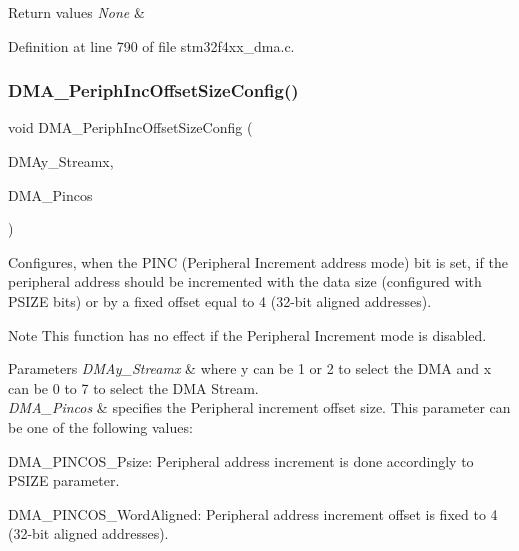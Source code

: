 \begin{DoxyRetVals}{Return values}
{\em None} & \\
\hline
\end{DoxyRetVals}


Definition at line 790 of file stm32f4xx\+\_\+dma.\+c.

\mbox{\label{group___d_m_a_ga210a9861460b3c9b3fa14fdc1a949744}} 
\subsubsection{\texorpdfstring{D\+M\+A\+\_\+\+Periph\+Inc\+Offset\+Size\+Config()}{DMA\_PeriphIncOffsetSizeConfig()}}
{\footnotesize\ttfamily void D\+M\+A\+\_\+\+Periph\+Inc\+Offset\+Size\+Config (\begin{DoxyParamCaption}\item[{\hyperlink{struct_d_m_a___stream___type_def}{D\+M\+A\+\_\+\+Stream\+\_\+\+Type\+Def} $\ast$}]{D\+M\+Ay\+\_\+\+Streamx,  }\item[{uint32\+\_\+t}]{D\+M\+A\+\_\+\+Pincos }\end{DoxyParamCaption})}



Configures, when the P\+I\+NC (Peripheral Increment address mode) bit is set, if the peripheral address should be incremented with the data size (configured with P\+S\+I\+ZE bits) or by a fixed offset equal to 4 (32-\/bit aligned addresses). 

\begin{DoxyNote}{Note}
This function has no effect if the Peripheral Increment mode is disabled.
\end{DoxyNote}

\begin{DoxyParams}{Parameters}
{\em D\+M\+Ay\+\_\+\+Streamx} & where y can be 1 or 2 to select the D\+MA and x can be 0 to 7 to select the D\+MA Stream. \\
\hline
{\em D\+M\+A\+\_\+\+Pincos} & specifies the Peripheral increment offset size. This parameter can be one of the following values\+: \begin{DoxyItemize}
\item D\+M\+A\+\_\+\+P\+I\+N\+C\+O\+S\+\_\+\+Psize\+: Peripheral address increment is done accordingly to P\+S\+I\+ZE parameter. \item D\+M\+A\+\_\+\+P\+I\+N\+C\+O\+S\+\_\+\+Word\+Aligned\+: Peripheral address increment offset is fixed to 4 (32-\/bit aligned addresses). \end{DoxyItemize}
\\
\hline
\end{DoxyParams}

